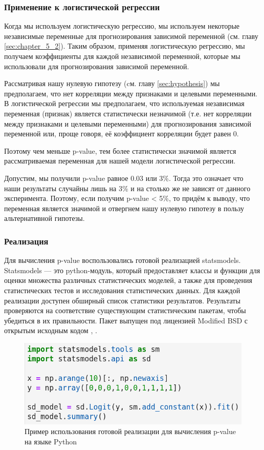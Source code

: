 \subsubsection{Применение к логистической регрессии}
\label{sec:chapter_6_2}

Когда мы используем логистическую регрессию, мы используем некоторые независимые
переменные для прогнозирования зависимой переменной (см. главу \ref{sec:chapter_5_2}).
Таким образом, применяя логистическую регрессию, мы получаем коэффициенты для каждой
независимой переменной, которые мы использовали для прогнозирования зависимой переменной.

Рассматривая нашу нулевую гипотезу (cм. главу \ref{sec:hypothesis}) мы предполагаем, что
нет корреляции между признаками и целевыми переменными. В логистической регрессии мы предполагаем, что используемая независимая переменная
(признак) является статистически незначимой (т.е. нет корреляции между признаками
и целевыми переменными) для прогнозирования зависимой переменной или, проще говоря,
её коэффициент корреляции будет равен 0.

Поэтому чем меньше p-value, тем более статистически значимой является рассматриваемая переменная
для нашей модели логистической регрессии.

Допустим, мы получили p-value равное 0.03 или 3\%. Тогда это означает что наши результаты
случайны лишь на 3\% и на столько же не зависят от данного эксперимента. Поэтому, если получим
p-value < 5\%, то придём к выводу, что переменная является значимой и отвергнем нашу
нулевую гипотезу в пользу альтернативной гипотезы.

\subsubsection{Реализация}

Для вычисления p-value воспользовались готовой реализацией statsmodels.
Statsmodels — это python-модуль, который предоставляет классы и функции для оценки
множества различных статистических моделей, а также для проведения статистических тестов
и исследования статистических данных. Для каждой реализации доступен обширный список 
статистики результатов. Результаты проверяются на соответствие существующим статистическим
пакетам, чтобы убедиться в их правильности. Пакет выпущен под лицензией Modified BSD с
открытым исходным кодом \cite{BSD}, \cite{statsmodels}.

\begin{figure}[H]
    \centering
    \includegraphics[width=0.7\linewidth]{images/12_2.png}
    \caption{Пример использования готовой реализации для вычисления p-value на языке Python}
    \label{fig_13}
\end{figure}
%

